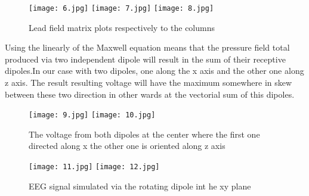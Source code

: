 \begin{figure}[!htbp]
%
\centering
\texttt{[image: 6.jpg]}
\endminipage\hfill
{}%
\centering
\texttt{[image: 7.jpg]}
\endminipage\hfill
{}%
\centering
\texttt{[image: 8.jpg]}
\endminipage\hfill
\caption{Lead field matrix plots respectively to the columns}
\end{figure}

Using the linearly of the Maxwell equation means that the pressure field total produced via two independent dipole will result in the sum of their receptive dipoles.In our case with two dipoles, one along the x axis and the other one along z axis. The result resulting voltage will have the maximum somewhere in skew between these two direction in other wards at the vectorial sum of this dipoles. 

\begin{figure}[!htbp]
%
\centering
\texttt{[image: 9.jpg]}
\subcaption{}
\endminipage\hfill
{}%
\centering
\texttt{[image: 10.jpg]}
\subcaption{}
\endminipage\hfill
\caption{The voltage from both dipoles at the center where the first one directed along x the other one is oriented along z axis}
\end{figure}


\begin{figure}[!htbp]
%
\centering
\texttt{[image: 11.jpg]}
\endminipage\hfill
{}%
\centering
\texttt{[image: 12.jpg]}
\endminipage\hfill
\caption{EEG signal simulated via the rotating dipole int he xy plane}
\end{figure}

